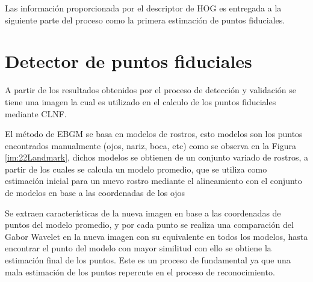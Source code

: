 Las información proporcionada por el descriptor de \ac{HOG} es entregada a la siguiente parte del proceso como la primera estimación de puntos fiduciales.


\section{Detector de puntos fiduciales}
A partir de los resultados obtenidos por el proceso de detección y validación se tiene una imagen la cual es utilizado en el calculo de los puntos fiduciales mediante \acf{CLNF}.%


El método de \ac{EBGM} se basa en modelos de rostros, esto modelos son los puntos encontrados manualmente (ojos, nariz, boca, etc) como se observa en la Figura \ref{im:22Landmark}, dichos modelos se obtienen de un conjunto variado de rostros, a partir de los cuales se calcula un modelo promedio, que se utiliza como estimación inicial para un nuevo rostro mediante el alineamiento con el conjunto de modelos en base a las coordenadas de los ojos 

Se extraen características de la nueva imagen en base a las coordenadas de puntos del modelo promedio, y por cada punto se realiza una comparación del Gabor Wavelet en la nueva imagen con su equivalente en todos los modelos, hasta encontrar el punto del modelo con mayor similitud con ello se obtiene la estimación final de los puntos. Este es un proceso de fundamental ya que una mala estimación de los puntos repercute en el proceso de reconocimiento.

